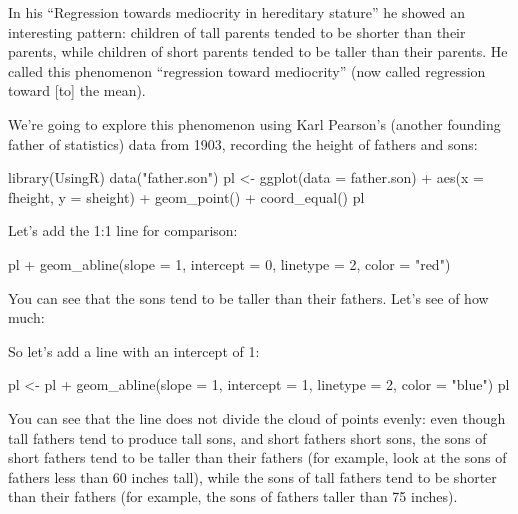 \documentclass[
  letterpaper,
  DIV=11,
  numbers=noendperiod]{scrreprt}
\newenvironment{Shaded}{\begin{snugshade}}{\end{snugshade}}
\newcommand{\NormalTok}[1]{\textcolor[rgb]{0.00,0.23,0.31}{#1}}
\begin{document}
In his ``Regression towards mediocrity in hereditary stature'' he showed
an interesting pattern: children of tall parents tended to be shorter
than their parents, while children of short parents tended to be taller
than their parents. He called this phenomenon ``regression toward
mediocrity'' (now called regression toward {[}to{]} the mean).

We're going to explore this phenomenon using Karl Pearson's (another
founding father of statistics) data from 1903, recording the height of
fathers and sons:

\begin{Shaded}
\begin{Highlighting}[]
\NormalTok{library(UsingR)}
\NormalTok{data("father.son")}
\NormalTok{pl \textless{}{-} ggplot(data = father.son) + aes(x = fheight, y = sheight) + geom\_point() + coord\_equal()}
\NormalTok{pl}
\end{Highlighting}
\end{Shaded}

Let's add the 1:1 line for comparison:

\begin{Shaded}
\begin{Highlighting}[]
\NormalTok{pl + geom\_abline(slope = 1, intercept = 0, linetype = 2, color = "red")}
\end{Highlighting}
\end{Shaded}

You can see that the sons tend to be taller than their fathers. Let's
see of how much:

\begin{Shaded}
\end{Shaded}

So let's add a line with an intercept of 1:

\begin{Shaded}
\begin{Highlighting}[]
\NormalTok{pl \textless{}{-} pl + geom\_abline(slope = 1, intercept = 1, linetype = 2, color = "blue")}
\NormalTok{pl}
\end{Highlighting}
\end{Shaded}

You can see that the line does not divide the cloud of points evenly:
even though tall fathers tend to produce tall sons, and short fathers
short sons, the sons of short fathers tend to be taller than their
fathers (for example, look at the sons of fathers less than 60 inches
tall), while the sons of tall fathers tend to be shorter than their
fathers (for example, the sons of fathers taller than 75 inches).
\end{document}
